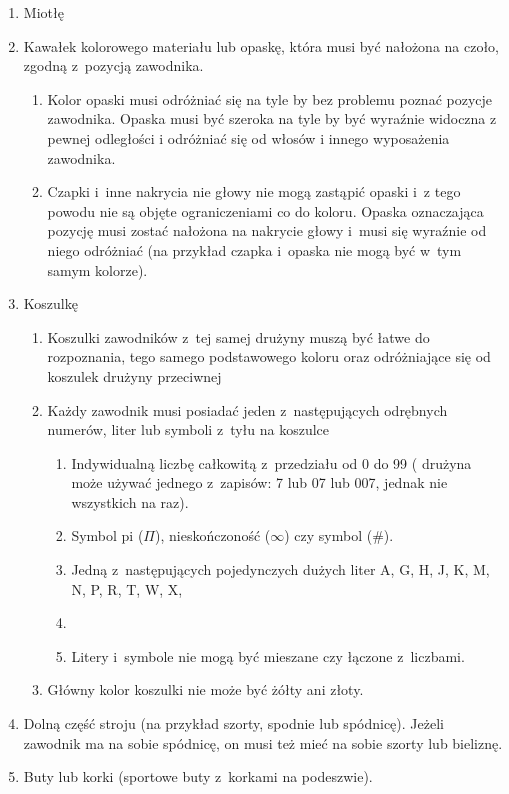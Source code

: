 \documentclass[12pt,a4paper]{article}
\begin{document}
\begin{enumerate}
	\item
	      Miotłę
	\item
	      Kawałek kolorowego materiału lub opaskę, która musi być nałożona na
	      czoło, zgodną z~pozycją zawodnika.

	      \begin{enumerate}
		      \item
		            Kolor opaski musi odróżniać się na tyle by bez problemu poznać
		            pozycje zawodnika.
		            Opaska musi być szeroka na tyle by być wyraźnie widoczna z pewnej odległości i odróżniać się od włosów i innego wyposażenia zawodnika.
		      \item
		            Czapki i~inne nakrycia nie głowy nie mogą zastąpić opaski i~z tego
		            powodu nie są objęte ograniczeniami co do koloru. Opaska oznaczająca
		            pozycję musi zostać nałożona na nakrycie głowy i~musi się wyraźnie
		            od niego odróżniać (na przykład czapka i~opaska nie mogą być w~tym
		            samym kolorze).
	      \end{enumerate}
	\item
	      Koszulkę

	      \begin{enumerate}
		      \item
		            Koszulki zawodników z~tej samej drużyny muszą być łatwe do
		            rozpoznania, tego samego podstawowego koloru oraz odróżniające się
		            od koszulek drużyny przeciwnej
		      \item
		            Każdy zawodnik musi posiadać jeden z~następujących odrębnych
		            numerów, liter lub symboli z~tyłu na koszulce

		            \begin{enumerate}
			            \item
			                  Indywidualną liczbę całkowitą z~przedziału od 0 do 99 ( drużyna
			                  może używać jednego z~zapisów: 7 lub 07 lub 007, jednak nie
			                  wszystkich na raz).
			            \item
			                  Symbol pi ($\Pi$), nieskończoność ($\infty$) czy symbol (\#).
			            \item
			                  Jedną z~następujących pojedynczych dużych liter A, G, H, J, K, M,
			                  N, P, R, T, W, X, \item
			            \item
			                  Litery i~symbole nie mogą być mieszane czy łączone z~liczbami.
		            \end{enumerate}
		      \item
		            Główny kolor koszulki nie może być żółty ani złoty.
	      \end{enumerate}
	\item
	      Dolną część stroju (na przykład szorty, spodnie lub spódnicę). Jeżeli
	      zawodnik ma na sobie spódnicę, on musi też mieć na sobie szorty lub
	      bieliznę.
	\item
	      Buty lub korki (sportowe buty z~korkami na podeszwie).


\end{enumerate}
\end{document}
